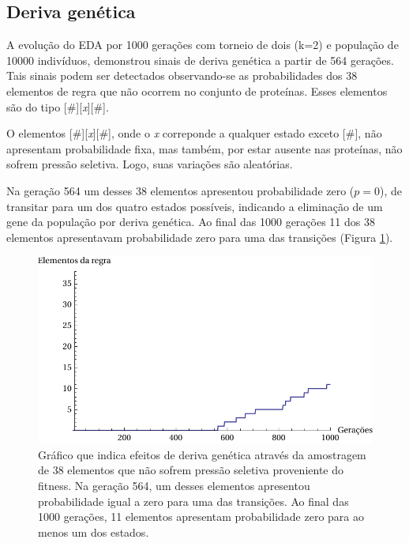 \subsection{Deriva genética}

A evolução do EDA por 1000 gerações com torneio de dois (k=2) e população de 10000 indivíduos, demonstrou sinais de deriva genética a partir de 564 gerações. Tais sinais podem ser detectados observando-se as probabilidades dos 38 elementos de regra que não ocorrem no conjunto de proteínas. Esses elementos são do tipo [\#][\textit{x}][\#].

O elementos [\#][\textit{x}][\#], onde o \textit{x} correponde a qualquer estado exceto [\#], não apresentam probabilidade fixa, mas também, por estar ausente nas proteínas, não sofrem pressão seletiva. Logo, suas variações são aleatórias.

Na geração 564 um desses 38 elementos apresentou probabilidade zero ($p=0$), de transitar para um dos quatro estados possíveis, indicando a eliminação de um gene da população por deriva genética. Ao final das 1000 gerações 11 dos 38 elementos apresentavam probabilidade zero para uma das transições (Figura \ref{fig:deriva_genetica}).

\begin{figure}
  \centering
  \includegraphics[width=1\textwidth]{figures/deriva_genetica.pdf}
  \caption{Gráfico que indica efeitos de deriva genética através da amostragem de 38 elementos que não sofrem pressão seletiva proveniente do fitness. Na geração 564, um desses elementos apresentou probabilidade igual a zero para uma das transições. Ao final das 1000 gerações, 11 elementos apresentam probabilidade zero para ao menos um dos estados.}
        \label{fig:deriva_genetica}
\end{figure}

